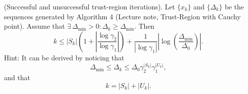 \documentclass{ExerciseSheet}
\newif\ifsolutions
\begin{document}


\begin{problem}(Successful and unsuccessful trust-region iterations). Let $\{x_k\}$ and $\{\Delta_k\}$ be the sequences generated by Algorithm 4 (Lecture note, Trust-Region with Cauchy point). Assume that $\exists \, \Delta_{\min} > 0 : \Delta_k \geq \Delta_{\min}$. Then
\[
k \leq |S_k| \left(1 + \left|\frac{\log \gamma_2}{\log \gamma_1} \right| \right) + \frac{1}{|\log \gamma_1|} \left| \log \left( \frac{\Delta_{\min}}{\Delta_0} \right) \right|.
\]
Hint: It can be derived by noticing that 
\[
\Delta_{\min} \leq \Delta_k \leq \Delta_0 \gamma_2^{|S_k|} \gamma_1^{|U_k|},
\]
and that 
\[
k = |S_k| + |U_k|.
\]
\end{problem}
\ifsolutions
\vskip 0.3cm
\end{document}
